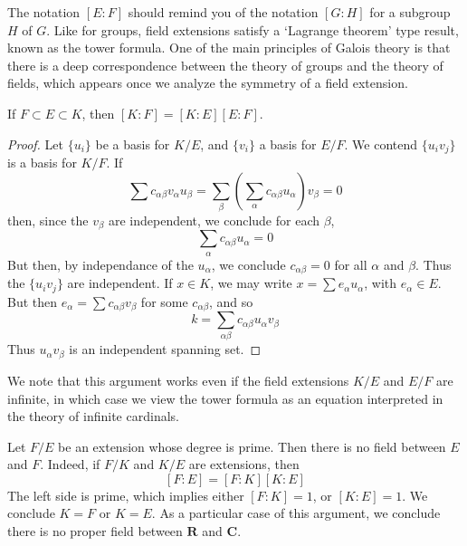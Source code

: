 The notation $[E:F]$ should remind you of the notation $[G:H]$ for a subgroup $H$ of $G$. Like for groups, field extensions satisfy a `Lagrange theorem' type result, known as the tower formula. One of the main principles of Galois theory is that there is a deep correspondence between the theory of groups and the theory of fields, which appears once we analyze the symmetry of a field extension.

\begin{theorem}
    If $F \subset E \subset K$, then $[K:F] = [K:E][E:F]$.
\end{theorem}
\begin{proof}
    Let $\{ u_i \}$ be a basis for $K/E$, and $\{ v_i \}$ a basis for $E/F$. We contend $\{ u_i v_j \}$ is a basis for $K/F$. If
    \[ \sum c_{\alpha \beta} v_\alpha u_\beta = \sum_\beta \left( \sum_\alpha c_{\alpha \beta} u_\alpha \right) v_\beta = 0 \]
    then, since the $v_\beta$ are independent, we conclude for each $\beta$,
    \[ \sum_\alpha c_{\alpha \beta} u_\alpha = 0 \]
    But then, by independance of the $u_\alpha$, we conclude $c_{\alpha \beta} = 0$ for all $\alpha$ and $\beta$. Thus the $\{ u_i v_j \}$ are independent. If $x \in K$, we may write $x = \sum e_\alpha u_\alpha$, with $e_\alpha \in E$. But then $e_\alpha = \sum c_{\alpha \beta} v_\beta$ for some $c_{\alpha \beta}$, and so
    \[ k = \sum_{\alpha \beta} c_{\alpha \beta} u_\alpha v_\beta \]
    Thus $u_\alpha v_\beta$ is an independent spanning set.
\end{proof}

We note that this argument works even if the field extensions $K/E$ and $E/F$ are infinite, in which case we view the tower formula as an equation interpreted in the theory of infinite cardinals.

\begin{example}
    Let $F/E$ be an extension whose degree is prime. Then there is no field between $E$ and $F$. Indeed, if $F/K$ and $K/E$ are extensions, then
    \[ [F:E] = [F:K][K:E] \]
    The left side is prime, which implies either $[F:K] = 1$, or $[K:E] = 1$. We conclude $K = F$ or $K = E$. As a particular case of this argument, we conclude there is no proper field between $\mathbf{R}$ and $\mathbf{C}$.
\end{example}

